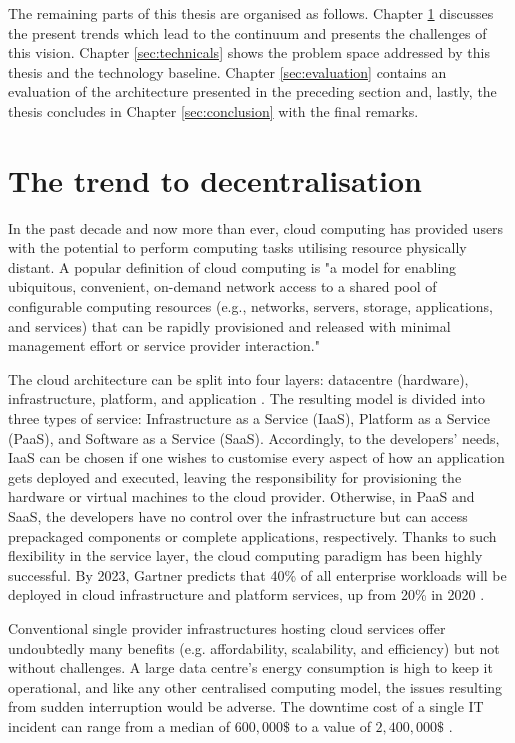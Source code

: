 The remaining parts of this thesis are organised as follows. Chapter \ref{sec:challenges} discusses the present trends which lead to the continuum and presents the challenges of this vision. Chapter \ref{sec:technicals} shows the problem space addressed by this thesis and the technology baseline. Chapter \ref{sec:evaluation} contains an evaluation of the architecture presented in the preceding section and, lastly, the thesis concludes in Chapter \ref{sec:conclusion} with the final remarks.

\section{The trend to decentralisation}
\label{sec:challenges}

In the past decade and now more than ever, cloud computing has provided users with the potential to perform computing tasks utilising resource physically distant. A popular definition of cloud computing \cite{cloud-def} is "a model for enabling ubiquitous, convenient, on-demand network access to a shared pool of configurable computing resources (e.g., networks, servers, storage, applications, and services) that can be rapidly provisioned and released with minimal management effort or service provider interaction."

The cloud architecture can be split into four layers: datacentre (hardware), infrastructure, platform, and application \cite{cloud-computing}. The resulting model is divided into three types of service: Infrastructure as a Service (IaaS), Platform as a Service (PaaS), and Software as a Service (SaaS). Accordingly, to the developers' needs, IaaS can be chosen if one wishes to customise every aspect of how an application gets deployed and executed, leaving the responsibility for provisioning the hardware or virtual machines to the cloud provider. Otherwise, in PaaS and SaaS, the developers have no control over the infrastructure but can access prepackaged components or complete applications, respectively. Thanks to such flexibility in the service layer, the cloud computing paradigm has been highly successful. By 2023, Gartner predicts that 40\% of all enterprise workloads will be deployed in cloud infrastructure and platform services, up from 20\% in 2020 \cite{gartner-cloud-edge}.

Conventional single provider infrastructures hosting cloud services offer undoubtedly many benefits (e.g. affordability, scalability, and efficiency) but not without challenges. A large data centre's energy consumption is high to keep it operational, and like any other centralised computing model, the issues resulting from sudden interruption would be adverse. The downtime cost of a single IT incident can range from a median of $600,000\$$ to a value of $2,400,000\$$ \cite{downtime-cost}.

